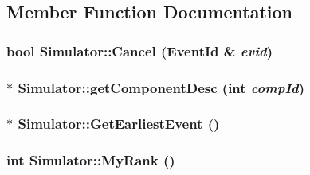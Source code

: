 \subsection{Member Function Documentation}
\hypertarget{classSimulator_f85320c35a3ef59e17244e53047a4501}{
\subsubsection[{Cancel}]{\setlength{\rightskip}{0pt plus 5cm}bool Simulator::Cancel ({\bf EventId} \& {\em evid})}}
\label{classSimulator_f85320c35a3ef59e17244e53047a4501}


\hypertarget{classSimulator_664a4bdb8925e0251e94131192743ff2}{
\subsubsection[{getComponentDesc}]{ $\ast$ Simulator::getComponentDesc (int {\em compId})}}
\label{classSimulator_664a4bdb8925e0251e94131192743ff2}


\hypertarget{classSimulator_766aee01e48e500f84af435626ab7004}{
\subsubsection[{GetEarliestEvent}]{ $\ast$ Simulator::GetEarliestEvent ()}}
\label{classSimulator_766aee01e48e500f84af435626ab7004}


\hypertarget{classSimulator_80bffbd51839958866ddd16fde614ecf}{
\subsubsection[{MyRank}]{\setlength{\rightskip}{0pt plus 5cm}int Simulator::MyRank ()}}
\label{classSimulator_80bffbd51839958866ddd16fde614ecf}


